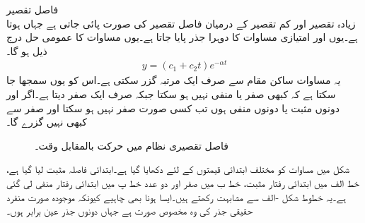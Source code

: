 \quad فاصل تقصیر\\
زیادہ تقصیر اور کم تقصیر کے درمیان فاصل تقصیر کی صورت پائی جاتی ہے جہاں  ہوتا ہے۔یوں  اور امتیازی مساوات کا دوہرا جذر  پایا جاتا ہے۔یوں مساوات  کا عمومی حل درج ذیل ہو گا۔
\begin{align}\label{مساوات_سادہ_دو_درجی_قصری_فاصل_حل_الف}
y=(c_1 +c_2 t)e^{-\alpha t}
\end{align}
یہ مساوات ساکن مقام  سے صرف ایک مرتبہ گزر سکتی ہے۔اس کو یوں سمجھا جا سکتا ہے کہ  کبھی صفر یا منفی نہیں ہو سکتا جبکہ  صرف ایک صفر دیتا ہے۔اگر  اور  دونوں مثبت یا دونوں منفی ہوں تب   کسی صورت  صفر نہیں ہو سکتا اور  صفر سے کبھی نہیں گزرے گا۔ 
\begin{figure}
\centering
{}
\caption{فاصل تقصیری نظام میں حرکت بالمقابل وقت۔}
\label{شکل_سادہ_دو_درجی_فاصل_تقصیری_حرکت_الف}
\end{figure}

شکل  میں مساوات  کو مختلف ابتدائی قیمتوں کے لئے دکھایا گیا ہے۔ابتدائی فاصلہ مثبت لیا گیا ہے، خط الف میں ابتدائی رفتار مثبت، خط ب میں صفر اور دو عدد خط پ میں ابتدائی رفتار منفی لی گئی ہے۔یہ خطوط  شکل -الف سے مشابہت رکھتے ہیں۔ایسا ہونا بھی چاہیے کیونکہ موجودہ صورت منفرد حقیقی جذر کی وہ مخصوص صورت ہے جہاں دونوں جذر عین برابر ہوں۔  

